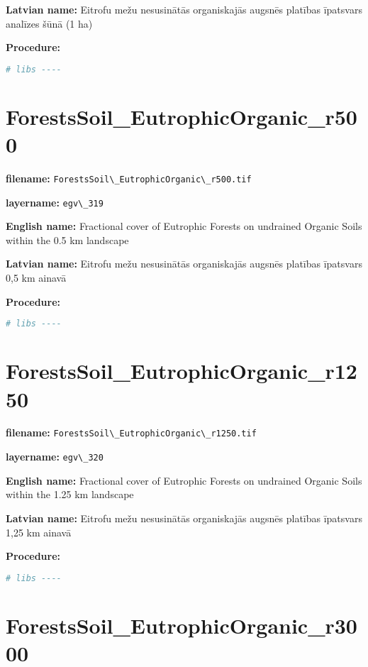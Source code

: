 \documentclass[
]{book}
\newcommand{\passthrough}[1]{#1}
\begin{document}
\textbf{Latvian name:} Eitrofu mežu nesusinātās organiskajās augsnēs platības īpatsvars analīzes šūnā (1 ha)

\textbf{Procedure:}

\begin{lstlisting}[language=R]
# libs ----
\end{lstlisting}

\section{ForestsSoil\_EutrophicOrganic\_r500}\label{ch06.319}

\textbf{filename:} \passthrough{\lstinline!ForestsSoil\_EutrophicOrganic\_r500.tif!}

\textbf{layername:} \passthrough{\lstinline!egv\_319!}

\textbf{English name:} Fractional cover of Eutrophic Forests on undrained Organic Soils within the 0.5 km landscape

\textbf{Latvian name:} Eitrofu mežu nesusinātās organiskajās augsnēs platības īpatsvars 0,5 km ainavā

\textbf{Procedure:}

\begin{lstlisting}[language=R]
# libs ----
\end{lstlisting}

\section{ForestsSoil\_EutrophicOrganic\_r1250}\label{ch06.320}

\textbf{filename:} \passthrough{\lstinline!ForestsSoil\_EutrophicOrganic\_r1250.tif!}

\textbf{layername:} \passthrough{\lstinline!egv\_320!}

\textbf{English name:} Fractional cover of Eutrophic Forests on undrained Organic Soils within the 1.25 km landscape

\textbf{Latvian name:} Eitrofu mežu nesusinātās organiskajās augsnēs platības īpatsvars 1,25 km ainavā

\textbf{Procedure:}

\begin{lstlisting}[language=R]
# libs ----
\end{lstlisting}

\section{ForestsSoil\_EutrophicOrganic\_r3000}\label{ch06.321}
\end{document}
